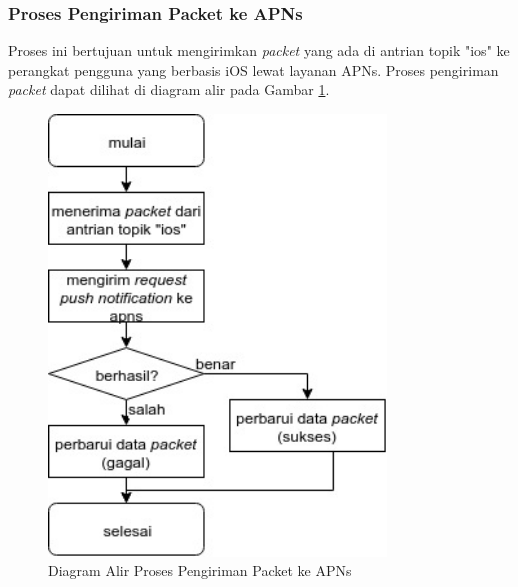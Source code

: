 \subsubsection{Proses Pengiriman Packet ke APNs}
\par Proses ini bertujuan untuk mengirimkan \textit{packet} yang ada di antrian topik "ios" ke perangkat pengguna yang berbasis iOS lewat layanan APNs. Proses pengiriman \textit{packet} dapat dilihat di diagram alir pada
Gambar \ref{flowchart_pengiriman_packet_ke_apns}.
\begin{figure}[H]
	\centering\includegraphics[width=0.8\textwidth]{bab3/img/flowchart-pengiriman_packet_ke_apns.jpg}
	\caption{Diagram Alir Proses Pengiriman Packet ke APNs} \label{flowchart_pengiriman_packet_ke_apns}
\end{figure}

